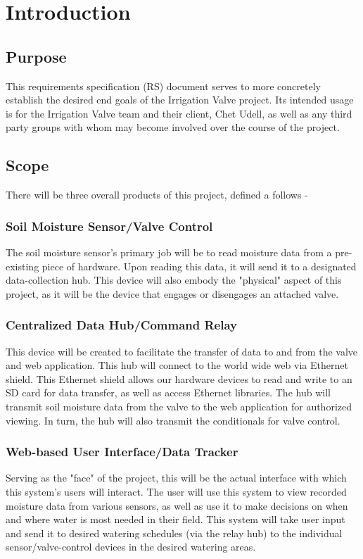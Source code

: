 \documentclass[onecolumn, draftclsnofoot,10pt, compsoc]{IEEEtran}
\begin{document}
	\section{Introduction}
	\subsection{Purpose}
	This requirements specification (RS) document serves to more concretely establish the desired end goals of the Irrigation Valve project.
	Its intended usage is for the Irrigation Valve team and their client, Chet Udell, as well as any third party groups with whom may become involved over the course of the project. 
	\subsection{Scope}
	There will be three overall products of this project, defined a follows -\vspace{-.1in}
	\subsubsection{Soil Moisture Sensor/Valve Control}
	The soil moisture sensor's primary job will be to read moisture data from a pre-existing piece of hardware.
	Upon reading this data, it will send it to a designated data-collection hub.
	This device will also embody the "physical" aspect of this project, as it will be the device that engages or disengages an attached valve.
	\subsubsection{Centralized Data Hub/Command Relay}
	This device will be created to facilitate the transfer of data to and from the valve and web application. This hub will connect to the world wide web via Ethernet shield.
	This Ethernet shield allows our hardware devices to read and write to an SD card for data transfer, as well as access Ethernet libraries. 
	The hub will transmit soil moisture data from the valve to the web application for authorized viewing.
	In turn, the hub will also transmit the conditionals for valve control. 
	\subsubsection{Web-based User Interface/Data Tracker}
	Serving as the "face" of the project, this will be the actual interface with which this system's users will interact.
	The user will use this system to view recorded moisture data from various sensors, as well as use it to make decisions on when and where water is most needed in their field.
	This system will take user input and send it to desired watering schedules (via the relay hub) to the individual sensor/valve-control devices in the desired watering areas.
\end{document}
